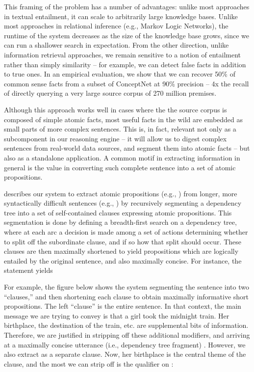 This framing of the problem has a number of advantages: unlike most 
  approaches in textual entailment, it can scale to arbitrarily large knowledge 
  bases.
Unlike most approaches in relational inference (e.g., Markov Logic Networks), 
  the runtime of the system decreases as the size of the knowledge base grows, 
  since we can run a shallower search in expectation.
From the other direction, unlike information retrieval approaches, we remain 
  sensitive to a notion of entailment rather than simply similarity -- for example, 
  we can detect false facts in addition to true ones.
In an empirical evaluation, we show that we can recover 50\% of common sense facts 
  from a subset of ConceptNet at 90\% precision -- 4x the recall of directly querying 
  a very large source corpus of 270 million premises.



%
%
Although this approach works well in cases where the the source corpus is composed
  of simple atomic facts, most useful facts in the wild are embedded as small parts
  of more complex sentences.
This is, in fact, relevant not only as a
  subcomponent in our reasoning engine -- it will allow us to digest complex
  sentences from real-world data sources, and segment them into atomic facts --
  but also as a standalone application.
A common motif in extracting information in general is the value in 
  converting such complete sentence into a set of atomic propositions.

 describes our system to extract atomic propositions (e.g., 
  ) from longer, more syntactically difficult 
  sentences (e.g., ) by recursively 
  segmenting a dependency tree into a set of self-contained clauses expressing 
  atomic propositions.
This segmentation is done by defining a breadth-first search on a dependency tree,
  where at each arc a decision is made among a set of actions determining whether
  to split off the subordinate clause, and if so how that split should occur.
These clauses are then maximally shortened to yield propositions which are
  logically entailed by the original sentence, and also maximally concise.
For instance, the statement 
  yields  

For example, the figure below shows the system segmenting the sentence
   into
  two ``clauses,'' and then shortening each clause to obtain maximally informative
  short propositions.
The left ``clause'' is the entire sentence.
In that context, the main message we are trying to convey is that a girl took the
  midnight train.
Her birthplace, the destination of the train, etc. are supplemental bits of information.
Therefore, we are justified in stripping off these additional modifiers, and arriving
  at a maximally concise utterance (i.e., dependency tree fragment) .
However, we also extract  as a separate clause.
Now, her birthplace is the central theme of the clause, and the most we can strip off is the qualifier
   on :

